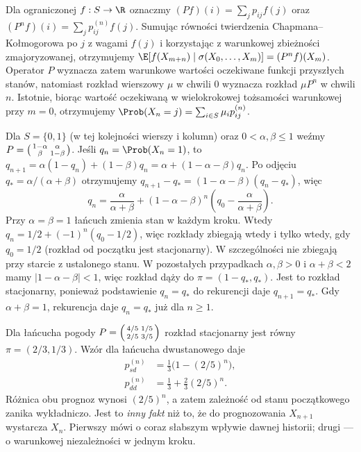 Dla ograniczonej $f:S\to\R$ oznaczmy
$(Pf)(i)=\sum_jp_{ij}f(j)$ oraz
$(P^nf)(i)=\sum_jp_{ij}^{(n)}f(j)$.
Sumując równości twierdzenia Chapmana--Kołmogorowa
po $j$ z wagami $f(j)$ i korzystając z warunkowej
zbieżności zmajoryzowanej, otrzymujemy
$\E[f(X_{m+n})\mid\sigma(X_0,\ldots,X_m)]
=(P^nf)(X_m)$. Operator $P$ wyznacza zatem
warunkowe wartości oczekiwane funkcji przyszłych stanów,
natomiast rozkład wierszowy $\mu$ w chwili $0$
wyznacza rozkład $\mu P^n$ w chwili $n$.
Istotnie, biorąc wartość oczekiwaną w wielokrokowej
tożsamości warunkowej przy $m=0$,
otrzymujemy $\Prob(X_n=j)=\sum_{i\in S}\mu_i p_{ij}^{(n)}$.

\begin{przyklad}
Dla $S=\{0,1\}$ (w tej kolejności wierszy i kolumn)
oraz $0<\alpha,\beta\leq1$ weźmy
$P=\begin{psmallmatrix}1-\alpha&\alpha\\
\beta&1-\beta\end{psmallmatrix}$.
Jeśli $q_n=\Prob(X_n=1)$, to
$q_{n+1}=\alpha(1-q_n)+(1-\beta)q_n
=\alpha+(1-\alpha-\beta)q_n$.
Po odjęciu $q_*=\alpha/(\alpha+\beta)$ otrzymujemy
$q_{n+1}-q_*=(1-\alpha-\beta)(q_n-q_*)$,
więc
\[
q_n=\frac{\alpha}{\alpha+\beta}
+(1-\alpha-\beta)^n
\left(q_0-\frac{\alpha}{\alpha+\beta}\right).
\]
Przy $\alpha=\beta=1$ łańcuch zmienia stan
w każdym kroku. Wtedy $q_n=1/2+(-1)^n(q_0-1/2)$,
więc rozkłady zbiegają wtedy i tylko wtedy,
gdy $q_0=1/2$ (rozkład od początku jest
stacjonarny). W szczególności nie zbiegają
przy starcie z ustalonego stanu. W pozostałych
przypadkach $\alpha,\beta>0$ i
$\alpha+\beta<2$ mamy $|1-\alpha-\beta|<1$,
więc rozkład dąży do $\pi=(1-q_*,q_*)$.
Jest to rozkład stacjonarny, ponieważ podstawienie
$q_n=q_*$ do rekurencji daje $q_{n+1}=q_*$.
Gdy $\alpha+\beta=1$, rekurencja daje
$q_n=q_*$ już dla $n\geq1$.
\end{przyklad}


\begin{przyklad}
Dla łańcucha pogody
$P=\begin{psmallmatrix}4/5&1/5\\2/5&3/5\end{psmallmatrix}$
rozkład stacjonarny jest równy
$\pi=(2/3,1/3)$. Wzór dla łańcucha dwustanowego
daje
\begin{align*}
p_{sd}^{(n)}&=\frac13\bigl(1-(2/5)^n\bigr),\\
p_{dd}^{(n)}&=\frac13+\frac23(2/5)^n.
\end{align*}
Różnica obu prognoz wynosi $(2/5)^n$,
a zatem zależność od stanu początkowego zanika
wykładniczo. Jest to \emph{inny fakt} niż to,
że do prognozowania $X_{n+1}$ wystarcza $X_n$.
Pierwszy mówi o coraz słabszym wpływie dawnej historii;
drugi — o warunkowej niezależności w jednym kroku.
\end{przyklad}

